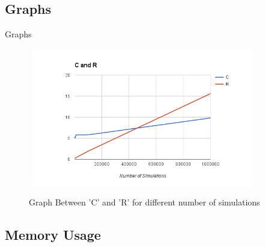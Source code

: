 \documentclass{beamer}
\begin{document}
\subsection{Graphs}
\begin{frame}{Graphs}{}

\begin{figure}
\includegraphics[width=10cm,height=6cm]{CvsR}\\
\caption{Graph Between 'C' and 'R' for different number of simulations}

\end{figure}

\end{frame}

\subsection{Memory Usage}
\end{document}
